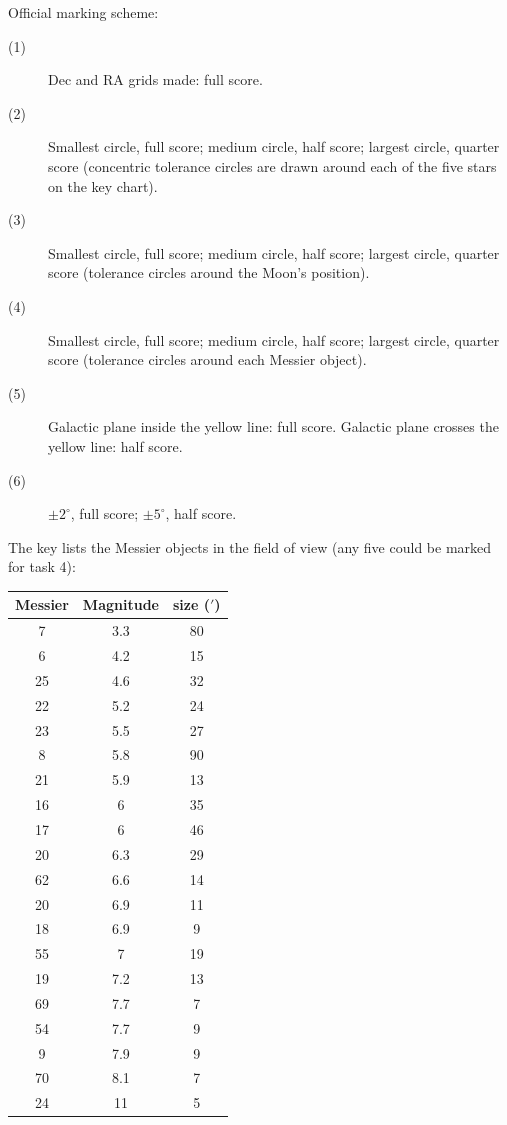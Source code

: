 Official marking scheme:

\begin{description}
\item[(1)] Dec and RA grids made: full score.
\item[(2)] Smallest circle, full score; medium circle, half score; largest
  circle, quarter score (concentric tolerance circles are drawn around each
  of the five stars on the key chart).
\item[(3)] Smallest circle, full score; medium circle, half score; largest
  circle, quarter score (tolerance circles around the Moon's position).
\item[(4)] Smallest circle, full score; medium circle, half score; largest
  circle, quarter score (tolerance circles around each Messier object).
\item[(5)] Galactic plane inside the yellow line: full score. Galactic
  plane crosses the yellow line: half score.
\item[(6)] $\pm 2^\circ$, full score; $\pm 5^\circ$, half score.
\end{description}




The key lists the Messier objects in the field of view (any five could be
marked for task 4):

\begin{center}
\begin{tabular}{ccc}
Messier & Magnitude & size ($'$) \\
\hline
7 & 3.3 & 80 \\
6 & 4.2 & 15 \\
25 & 4.6 & 32 \\
22 & 5.2 & 24 \\
23 & 5.5 & 27 \\
8 & 5.8 & 90 \\
21 & 5.9 & 13 \\
16 & 6 & 35 \\
17 & 6 & 46 \\
20 & 6.3 & 29 \\
62 & 6.6 & 14 \\
20 & 6.9 & 11 \\ %
18 & 6.9 & 9 \\
55 & 7 & 19 \\
19 & 7.2 & 13 \\
69 & 7.7 & 7 \\
54 & 7.7 & 9 \\
9 & 7.9 & 9 \\
70 & 8.1 & 7 \\
24 & 11 & 5 \\ %
\end{tabular}
\end{center}

